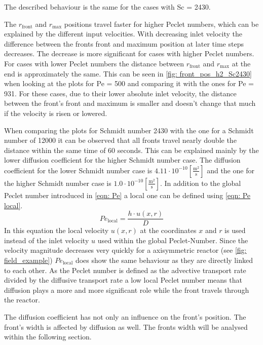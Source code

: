 \documentclass[../thesis.tex]{subfiles}
\begin{document}
The described behaviour is the same for the cases with Sc = 2430.

The $r_{\text{front}}$ and $r_{\text{max}}$ positions travel faster for higher Peclet numbers, which can be explained by the different input velocities. With decreasing inlet velocity the difference between the fronts front and maximum position at later time steps decreases. The decrease is more significant for cases with higher Peclet numbers. For cases with lower Peclet numbers the distance between  $r_{\text{front}}$ and $r_{\text{max}}$ at the end is approximately the same. This can be seen in \autoref{fig: front_pos_h2_Sc2430} when looking at the plots for Pe = 500 and comparing it with the ones for Pe = 931. For these cases, due to their lower absolute inlet velocity, the distance between the front's front and maximum is smaller and doesn't change that much if the velocity is risen or lowered.

When comparing the plots for Schmidt number 2430 with the one for a Schmidt number of 12000 it can be observed that all fronts travel nearly double the distance within the same time of 60 seconds. This can be explained mainly by the lower diffusion coefficient for the higher Schmidt number case. The diffusion coefficient for the lower Schmidt number case is $4 \text{.}11 \cdot 10^{-10} \left[ \frac{\mathrm{m^2}}{\mathrm{s}} \right]$ and the one for the higher Schmidt number case is $1\text{.}0 \cdot 10^{-10} \left[ \frac{\mathrm{m^2}}{\mathrm{s}} \right]$. In addition to the global Peclet number introduced in \autoref{eqn: Pe} a local one can be defined using \autoref{eqn: Pe local}.
\begin{equation}
	Pe_{\text{local}} = \dfrac{h \cdot u(x,r)}{D}
	\label{eqn: Pe local}
\end{equation}
In this equation the local velocity $u(x,r)$ at the coordinates $x$ and $r$ is used instead of the inlet velocity $u$ used within the global Peclet-Number.
Since the velocity magnitude decreases very quickly for a axisymmetric reactor (see \autoref{fig: field_example}) $Pe_{\text{local}}$ does show the same behaviour as they are directly linked to each other. As the Peclet number is defined as the advective transport rate divided by the diffusive transport rate a low local Peclet number means that diffusion plays a more and more significant role while the front travels through the reactor. 

The diffusion coefficient has not only an influence on the front's position. The front's width is affected by diffusion as well. The fronts width will be analysed within the following section.
\end{document}
